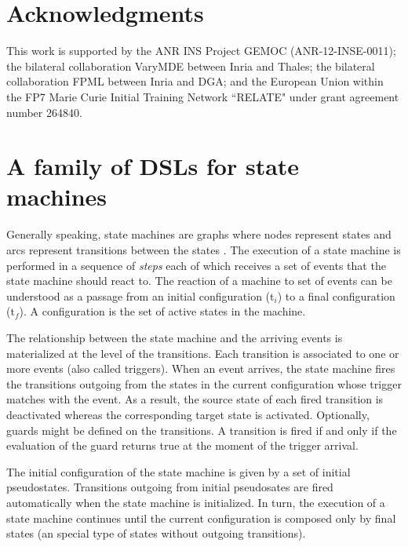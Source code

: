 \documentclass[preprint,5p]{elsarticle}
\begin{document}





%




\section*{Acknowledgments}
This work is supported by the ANR INS Project GEMOC (ANR-12-INSE-0011); the bilateral collaboration VaryMDE between Inria and Thales; the bilateral collaboration FPML between Inria and DGA; and the European Union within the FP7 Marie Curie Initial Training Network “RELATE" under grant agreement number 264840.

\appendix

\section{A family of DSLs for state machines}

Generally speaking, state machines are graphs where nodes represent states and arcs represent transitions between the states \cite{Harel:1987}. The execution of a state machine is performed in a sequence of \textit{steps} each of which receives a set of events that the state machine should react to. The reaction of a machine to set of events can be understood as a passage from an initial configuration (t$_i$) to a final configuration (t$_{f}$). A configuration is the set of active states in the machine.

The relationship between the state machine and the arriving events is materialized at the level of the transitions. Each transition is associated to one or more events (also called triggers). When an event arrives, the state machine fires the transitions outgoing from the states in the current configuration whose trigger matches with the event. As a result, the source state of each fired transition is deactivated whereas the corresponding target state is activated. Optionally, guards might be defined on the transitions. A transition is fired if and only if the evaluation of the guard returns true at the moment of the trigger arrival.

The initial configuration of the state machine is given by a set of initial pseudostates.  Transitions outgoing from initial pseudosates are fired automatically when the state machine is initialized. In turn, the execution of a state machine continues until the current configuration is composed only by final states (an special type of states without outgoing transitions).
\end{document}
